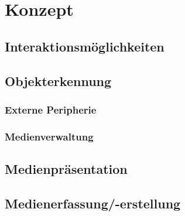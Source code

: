 \chapter{Konzept}
\section{Interaktionsmöglichkeiten}
\section{Objekterkennung}
\subsection{Externe Peripherie}
\subsection{Medienverwaltung}
\section{Medienpräsentation}
\section{Medienerfassung/-erstellung}